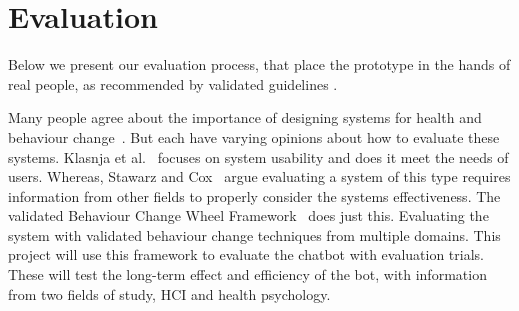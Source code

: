 
\newpage
\section{Evaluation}
Below we present our evaluation process, that place the prototype in the hands of real people, as recommended by validated guidelines \cite{article_mhealth, article_evaluate_tech_health_behaviour_change}.

Many people agree about the importance of designing systems for health and behaviour
change~\cite{article_mhealth, article_designing_for_healthy_lifestyles, article_designing_for_health_behaviour_change_hci}.
But each have varying opinions about how to evaluate these systems. Klasnja et al.~\cite{article_evaluate_tech_health_behaviour_change} focuses on system usability and does it meet the needs of users.
Whereas, Stawarz and Cox~\cite{article_designing_for_health_behaviour_change_hci} argue evaluating a system of this type requires information from other fields
to properly consider the systems effectiveness. The validated Behaviour Change Wheel Framework~\cite{article_behaviour_change_wheel} does just this.
Evaluating the system with validated behaviour change techniques from multiple domains. This project will use this framework to evaluate the chatbot with evaluation trials.
These will test the long-term effect and efficiency of the bot, with information from two fields of study, HCI and health psychology.

